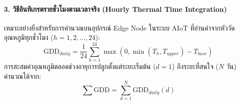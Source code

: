 \paragraph{3. วิธีอินทิเกรตรายชั่วโมงตามเวลาจริง (Hourly Thermal Time Integration)} เหมาะอย่างยิ่งสำหรับการคำนวณบนอุปกรณ์ Edge Node ในระบบ AIoT ที่อ่านค่าจากหัววัดอุณหภูมิทุกชั่วโมง ($h=1, 2, \dots, 24$):
\begin{equation}
\text{GDD}_{daily} = \frac{1}{24} \sum_{h=1}^{24} \max\left(0, \min(T_h, T_{upper}) - T_{base}\right)
\label{eq:gdd_hourly}
\end{equation}
การสะสมค่าอุณหภูมิตลอดช่วงอายุการปลูกตั้งแต่ระยะเริ่มต้น ($d=1$) ถึงระยะที่สนใจ ($N$ วัน) คำนวณได้จาก:
\begin{equation}
\sum \text{GDD} = \sum_{d=1}^{N} \text{GDD}_{daily}(d)
\label{eq:gdd_accumulated}
\end{equation}

